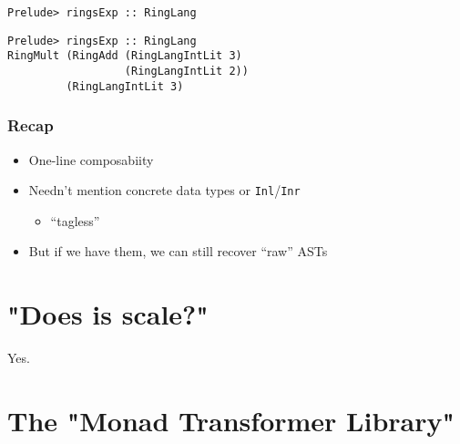 \documentclass[pdf]{beamer}
\begin{document}
\begin{frame}[fragile]
\begin{lstlisting}
Prelude> ringsExp :: RingLang

\end{lstlisting}
\end{frame}

\begin{frame}[fragile]
\begin{lstlisting}
Prelude> ringsExp :: RingLang
RingMult (RingAdd (RingLangIntLit 3) 
                  (RingLangIntLit 2)) 
         (RingLangIntLit 3)
\end{lstlisting}
\end{frame}

\begin{frame}
  \frametitle{Recap}
  \begin{itemize}
  \pause
  \item One-line composabiity
  \pause
  \item Needn't mention concrete data types or \lstinline{Inl}/\lstinline{Inr}
    \pause
    \begin{itemize}
    \item ``tagless''
    \end{itemize}
  \pause
  \item But if we have them, we can still recover ``raw'' ASTs
  \end{itemize}
\end{frame}

\section{"Does is scale?"}

\begin{frame}
  Yes.
\end{frame}

\section{The "Monad Transformer Library"}
\end{document}
